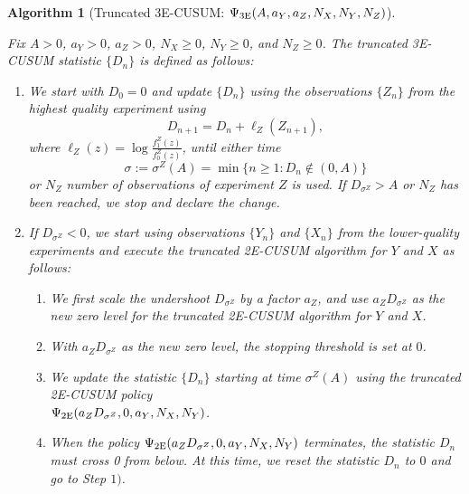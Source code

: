 \documentclass[journal, onecolumn]{IEEEtran}
\newtheorem{algorithm}{Algorithm}
\begin{document}
\begin{algorithm}[Truncated 3E-CUSUM: $\Psi_{\textup{3E}} (A, a_Y, a_Z, N_X, N_Y, N_Z)$]
\label{alg:trunc-3e}

Fix $A > 0$, $a_Y > 0$, $a_Z > 0$, $N_X \geq 0$, $N_Y \geq 0$, and $N_Z \geq 0$. The truncated \textup{3E-CUSUM} statistic $\{ D_n \}$ is defined as follows:

\begin{enumerate}
\item We start with $D_0 = 0$ and update $\{ D_n \}$ using the observations $\{ Z_n \}$ from the highest quality experiment using
$$ D_{n + 1}  = D_n + \ell_Z (Z_{n + 1}), $$
where $\ell_Z (z) = \log \frac{f_1^Z (z)}{f_0^Z (z)}$, until either time
$$ \sigma := \sigma^Z(A) = \min \{ n \geq 1: D_n \notin (0, A) \} $$
or $N_Z$ number of observations of experiment $Z$ is used. If $D_{\sigma^Z} > A$ or $N_Z$ has been reached, we stop and declare the change.

\item If $D_{\sigma^Z} < 0$, we start using observations $\{ Y_n \}$ and $\{ X_n \}$ from the lower-quality experiments and execute the truncated \textup{2E-CUSUM} algorithm for $Y$ and $X$ as follows:
    
    \begin{enumerate}
    \item We first scale the undershoot $D_{\sigma^Z}$ by a factor $a_Z$, and use $a_Z D_{\sigma^Z}$ as the new zero level for the truncated \textup{2E-CUSUM} algorithm for $Y$ and $X$.
    
    \item With $a_Z D_{\sigma^Z}$ as the new zero level, the stopping threshold is set at $0$.
    
    \item We update the statistic $\{ D_n \}$ starting at time $\sigma^Z(A)$ using the truncated \textup{2E-CUSUM} policy \\ $\Psi_{\textup{2E}} (a_Z D_{\sigma^Z}, 0, a_Y, N_X, N_Y)$.
    
    \item When the policy $\Psi_{\textup{2E}} (a_Z D_{\sigma^Z}, 0, a_Y, N_X, N_Y)$ terminates, the statistic $D_n$ must cross 0 from below. At this time, we reset the statistic $D_n$ to $0$ and go to Step $1)$.
    \end{enumerate}
\end{enumerate}    
\end{algorithm}
\end{document}
